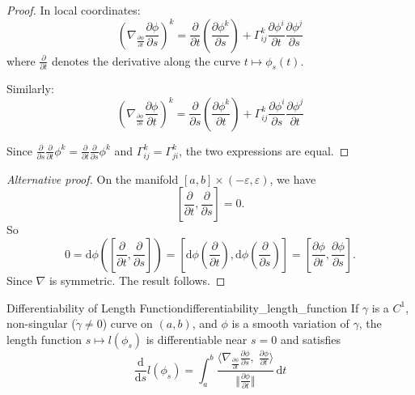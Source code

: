 \begin{proof}

In local coordinates:
\[
\left(\nabla_{\frac{\partial \phi}{\partial t}} \frac{\partial \phi}{\partial s}\right)^k = \frac{\partial}{\partial t}\left(\frac{\partial \phi^k}{\partial s}\right) + \Gamma^k_{ij} \frac{\partial \phi^i}{\partial t} \frac{\partial \phi^j}{\partial s}
\]
where $\frac{\partial}{\partial t}$ denotes the derivative along the curve $t \mapsto \phi_s(t)$.

Similarly:
\[
\left(\nabla_{\frac{\partial \phi}{\partial s}} \frac{\partial \phi}{\partial t}\right)^k = \frac{\partial}{\partial s}\left(\frac{\partial \phi^k}{\partial t}\right) + \Gamma^k_{ij} \frac{\partial \phi^i}{\partial s} \frac{\partial \phi^j}{\partial t}
\]

Since $\displaystyle \frac{\partial}{\partial s}\frac{\partial}{\partial t}\phi^k = \frac{\partial}{\partial t}\frac{\partial}{\partial s}\phi^k$ and $\Gamma^k_{ij} = \Gamma^k_{ji}$, the two expressions are equal.
\end{proof}

\begin{proof}[Alternative proof]

On the manifold $[a,b] \times (-\varepsilon, \varepsilon)$, we have
\[
\left[\frac{\partial}{\partial t}, \frac{\partial}{\partial s}\right] = 0.
\]
So
\[
0 = \mathrm{d}\phi\left(\left[\frac{\partial}{\partial t}, \frac{\partial}{\partial s}\right]\right) = \left[\mathrm{d}\phi\left(\frac{\partial}{\partial t}\right), \mathrm{d}\phi\left(\frac{\partial}{\partial s}\right)\right] = \left[\frac{\partial \phi}{\partial t}, \frac{\partial \phi}{\partial s}\right].
\]
Since $\nabla$ is symmetric. The result follows.

\end{proof}



\begin{colorlem}{Differentiability of Length Function}{differentiability_length_function}
If $\gamma$ is a $C^1$, non-singular ($\dot{\gamma} \neq 0$) curve on $(a,b)$, and $\phi$ is a smooth variation of $\gamma$, the length function $s \mapsto l(\phi_s)$ is differentiable near $s = 0$ and satisfies
\[
\frac{\mathrm{d}}{\mathrm{d}s} l(\phi_s) = \int_a^b \frac
    {\big\langle \nabla_{\frac{\partial \phi}{\partial t}} \frac{\partial \phi}{\partial s},\; \frac{\partial \phi}{\partial t} \big\rangle}
    {\big\Vert\frac{\partial \phi}{\partial t}\big\Vert} 
\,\mathrm{d}t
\]
\end{colorlem}

